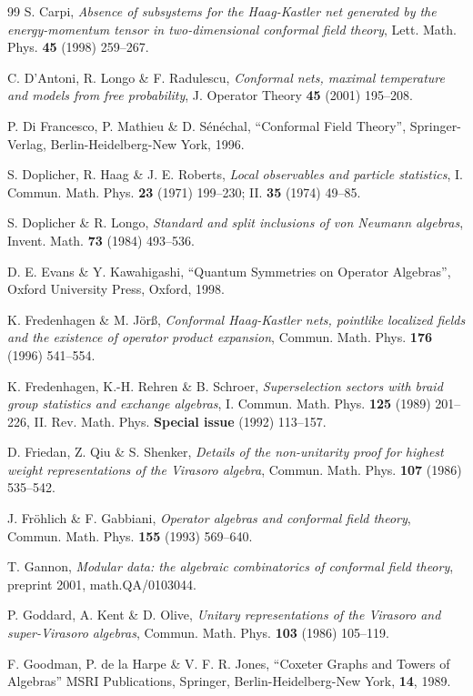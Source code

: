 \documentclass[12pt]{article}
\begin{document}
{\begin{thebibliography}{99}
 S. Carpi, {\it Absence of subsystems for the Haag-Kastler 
net generated by the energy-momentum tensor in two-dimensional conformal 
field theory}, Lett. Math. Phys. {\bf 45} (1998) 259--267.

 C. D'Antoni,  R. Longo \& F. Radulescu,
{\it Conformal nets, maximal temperature and models from free
probability}, J. Operator Theory {\bf 45} (2001) 195--208.

P. Di Francesco, P. Mathieu \& D. S\'en\'echal,
``Conformal Field Theory'', Springer-Verlag, 
Berlin-Heidelberg-New York, 1996.

   S. Doplicher, R. Haag \& J. E. Roberts,
{\it Local observables and particle statistics}, I. Commun. Math. Phys.
{\bf 23} (1971) 199--230; II. {\bf 35} (1974) 49--85.

  S. Doplicher \& R. Longo,
{\it Standard and split inclusions of von Neumann algebras},
Invent. Math.  {\bf 73} (1984) 493--536.

 D. E. Evans \& Y. Kawahigashi,
``Quantum Symmetries on Operator Algebras'',
Oxford University Press, Oxford, 1998.

 K.  Fredenhagen \& M. J\"or\ss, 
{\it Conformal Haag-Kastler nets, pointlike localized fields and the 
existence of operator product expansion}, 
Commun. Math. Phys.  {\bf 176} (1996) 541--554.

K. Fredenhagen, K.-H. Rehren \& B. Schroer,
{\it Superselection sectors with braid group statistics
and exchange algebras}, 
I. Commun. Math. Phys.  {\bf 125} (1989) 201--226,
II. Rev. Math. Phys. {\bf Special issue} (1992) 113--157.

D. Friedan, Z. Qiu \& S. Shenker,  
{\it Details of the non-unitarity proof for highest weight 
representations of the Virasoro algebra}, 
Commun. Math. Phys. {\bf 107} (1986) 535--542.

J. Fr\"ohlich \& F. Gabbiani,
{\it Operator algebras and conformal field theory},
Commun.  Math.  Phys.  {\bf 155} (1993) 569--640.

T. Gannon,
{\it Modular data: the algebraic combinatorics of
conformal field theory}, preprint 2001, math.QA/0103044.

P. Goddard, A. Kent \& D. Olive,
{\it Unitary representations of the Virasoro and
super-Virasoro algebras},
Commun.  Math.  Phys. {\bf 103} (1986) 105--119.

F. Goodman, P. de la Harpe \& V. F. R. Jones,
``Coxeter Graphs and Towers of Algebras''
MSRI Publications, Springer, Berlin-Heidelberg-New York,
{\bf 14}, 1989.


\end{thebibliography}}
\end{document}
